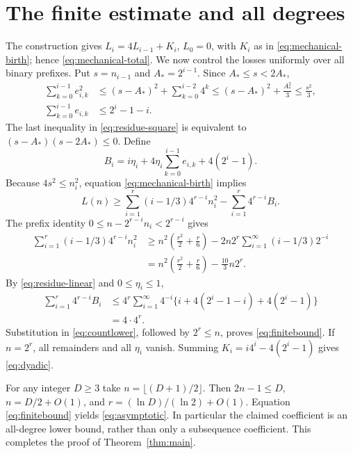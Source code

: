 \section{The finite estimate and all degrees}\label{sec:counting}

The construction gives $L_i=4L_{i-1}+K_i$, $L_0=0$, with
$K_i$ as in \eqref{eq:mechanical-birth}; hence \eqref{eq:mechanical-total}. We now control the
losses uniformly over all binary prefixes.
Put $s=n_{i-1}$ and $A_*=2^{i-1}$. Since $A_*\le s<2A_*$,
\begin{align}
 \sum_{k=0}^{i-1}e_{i,k}^2
 &\le (s-A_*)^2+\sum_{k=0}^{i-2}4^k
 \le(s-A_*)^2+\frac{A_*^2}{3}
 \le\frac{s^2}{3},\label{eq:residue-square}\\
 \sum_{k=0}^{i-1}e_{i,k}
 &\le 2^i-1-i.\label{eq:residue-linear}
\end{align}
The last inequality in \eqref{eq:residue-square} is equivalent to
$(s-A_*)(s-2A_*)\le0$. Define
\[
 B_i=i\eta_i+4\eta_i\sum_{k=0}^{i-1}e_{i,k}+4(2^i-1).
\]
Because $4s^2\le n_i^2$, equation \eqref{eq:mechanical-birth} implies
\begin{equation}\label{eq:countlower}
 L(n)\ge\sum_{i=1}^r(i-1/3)4^{r-i}n_i^2
             -\sum_{i=1}^r4^{r-i}B_i.
\end{equation}
The prefix identity $0\le n-2^{r-i}n_i<2^{r-i}$ gives
\begin{align*}
 \sum_{i=1}^r(i-1/3)4^{r-i}n_i^2
 &\ge n^2\left(\frac{r^2}{2}+\frac r6\right)
       -2n2^r\sum_{i=1}^{\infty}(i-1/3)2^{-i}\\
 &=n^2\left(\frac{r^2}{2}+\frac r6\right)-\frac{10}{3}n2^r.
\end{align*}
By \eqref{eq:residue-linear} and $0\le\eta_i\le1$,
\begin{align*}
 \sum_{i=1}^r4^{r-i}B_i
 &\le4^r\sum_{i=1}^{\infty}4^{-i}
       \{i+4(2^i-1-i)+4(2^i-1)\}\\
 &=4\cdot4^r.
\end{align*}
Substitution in \eqref{eq:countlower}, followed by $2^r\le n$, proves
\eqref{eq:finitebound}. If $n=2^r$, all remainders and all $\eta_i$
vanish. Summing $K_i=i4^i-4(2^i-1)$ gives \eqref{eq:dyadic}.

For any integer $D\ge3$ take $n=\lfloor(D+1)/2\rfloor$.
Then $2n-1\le D$, $n=D/2+O(1)$, and
$r=(\ln D)/(\ln2)+O(1)$. Equation \eqref{eq:finitebound} yields
\eqref{eq:asymptotic}. In particular the claimed coefficient is an
all-degree lower bound, rather than only a subsequence coefficient.
This completes the proof of Theorem~\ref{thm:main}.

